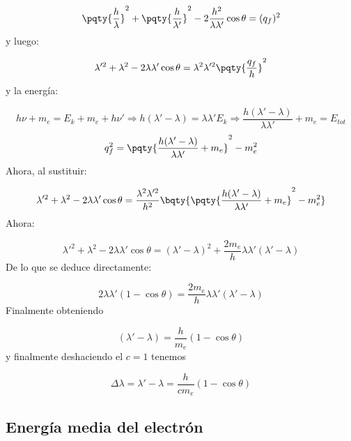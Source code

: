 \begin{equation}
    \pqty{\frac{h}{\lambda}}^2 + \pqty{\frac{h}{\lambda'}}^2 
    - 2 \frac{h^2}{\lambda \lambda'} \cos \theta = (q_f)^2
\end{equation}
y luego: 

\begin{equation}
    \lambda'^2 + \lambda^2 - 2 \lambda\lambda' \cos \theta = \lambda^2 \lambda'^2 \pqty{\frac{q_f}{h}}^2
\end{equation}
y la energía: 

\begin{equation}
    h \nu + m_e = E_k + m_e + h \nu' \Rightarrow  h(\lambda'-\lambda) =\lambda \lambda' E_k \Rightarrow \frac{h(\lambda'-\lambda)}{\lambda \lambda'} + m_e = E_{tot}
\end{equation}
\begin{equation}
    q_f^2 = \pqty{\frac{h(\lambda'-\lambda)}{\lambda \lambda'} + m_e }^2 - m_e^2 
\end{equation}
Ahora, al sustituir: 

\begin{equation}
    \lambda'^2 + \lambda^2 - 2 \lambda\lambda' \cos \theta = \frac{\lambda^2 \lambda'^2}{h^2} \bqty{\pqty{\frac{h(\lambda'-\lambda)}{\lambda \lambda'} + m_e }^2 - m_e^2 }
\end{equation}
Ahora: 

\begin{equation}
    \lambda'^2 + \lambda^2 - 2 \lambda \lambda' \cos \theta = (\lambda'- \lambda)^2 + \frac{2 m_e}{h}  \lambda \lambda' (\lambda'-\lambda)
\end{equation}
De lo que se deduce directamente: 

\begin{equation}
    2\lambda \lambda' (1-\cos \theta) = \frac{2 m_e}{h}  \lambda \lambda' (\lambda'-\lambda)
\end{equation}
Finalmente obteniendo 

\begin{equation}
     (\lambda'-\lambda)= \frac{h}{m_e}(1-\cos \theta) 
\end{equation}
y finalmente deshaciendo el $c=1$ tenemos 

\begin{equation}
    \Delta \lambda = \lambda'-\lambda = \frac{h}{cm_e}(1-\cos \theta) 
\end{equation}

\subsection{Energía media del electrón}

